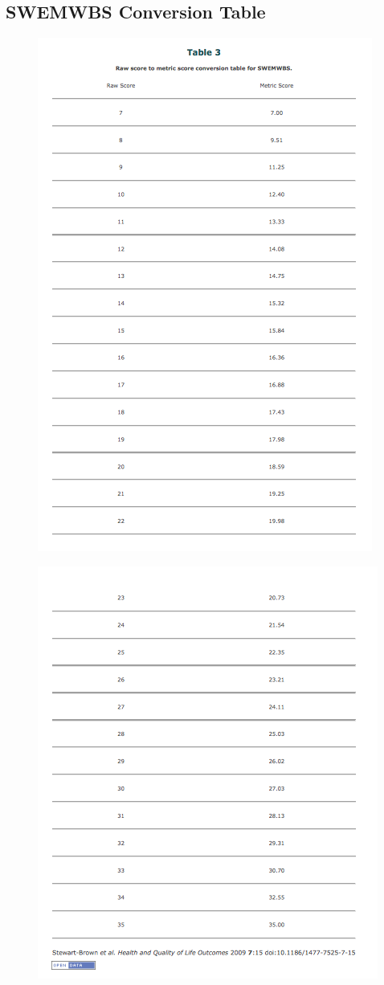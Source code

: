 \documentclass[11pt,openright,a4paper]{report}
\begin{document}
\printbibliography

\begin{appendices}
\section{SWEMWBS Conversion Table} \label{SWEMWBS Conversion Table}
\begin{figure}[ht]
  \centering
  \includegraphics[width =.7\textwidth]{i/swemwbsconversiontable1.png}
  \label{swemwbsconversiontable}
\end{figure}

\newpage
\begin{figure}[ht]
  \centering
  \includegraphics[width =.7\textwidth]{i/swemwbsconversiontable2.png}
\end{figure}


\end{appendices}
\end{document}

